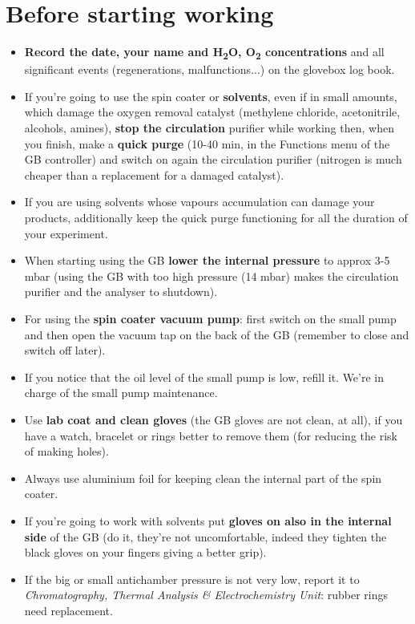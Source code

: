 \documentclass[a4paper,15pt]{scrartcl}
\begin{document}
\section*{Before starting working}
\begin{itemize}
	\item     \textbf{Record the date, your name and H\textsubscript{2}O, O\textsubscript{2} concentrations} and all significant events (regenerations, malfunctions...) on the glovebox log book.
	\item     If you're going to use the spin coater or \textbf{solvents}, even if in small amounts, which damage the oxygen removal catalyst (methylene chloride, acetonitrile, alcohols, amines), \textbf{stop the circulation} purifier while working then, when you finish, make a \textbf{quick purge} (10-40 min, in the Functions menu of the GB controller) and switch on again the circulation purifier (nitrogen is much cheaper than a replacement for a damaged catalyst).
	\item     If you are using solvents whose vapours accumulation can damage your products, additionally keep the quick purge functioning for all the duration of your experiment.
	\item     When starting using the GB \textbf{lower the internal pressure} to approx 3-5 mbar (using the GB with too high pressure (14 mbar) makes the circulation purifier and the analyser to shutdown).
	\item    For using the \textbf{spin coater vacuum pump}: first switch on the small pump and then open the vacuum tap on the back of the GB (remember to close and switch off later).
	\item     If you notice that the oil level of the small pump is low, refill it. We're in charge of the small pump maintenance. 
	\item     Use \textbf{lab coat and clean gloves} (the GB gloves are not clean, at all), if you have a watch, bracelet or rings better to remove them (for reducing the risk of making holes).
	\item     Always use aluminium foil for keeping clean the internal part of the spin coater.
	\item     If you're going to work with solvents put \textbf{gloves on also in the internal side} of the GB (do it, they're not uncomfortable, indeed they tighten the black gloves on your fingers giving a better grip).
	\item     If the big or small antichamber pressure is not very low, report it to \textit{Chromatography, Thermal Analysis \& Electrochemistry Unit}: rubber rings need replacement.
\end{itemize}
\end{document}
